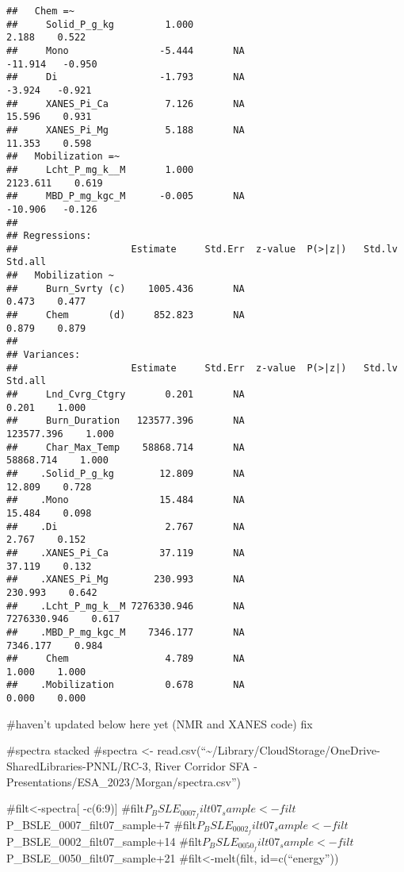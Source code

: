 \documentclass[
]{article}
\begin{document}
\begin{verbatim}
##   Chem =~                                                                     
##     Solid_P_g_kg         1.000                                  2.188    0.522
##     Mono                -5.444       NA                       -11.914   -0.950
##     Di                  -1.793       NA                        -3.924   -0.921
##     XANES_Pi_Ca          7.126       NA                        15.596    0.931
##     XANES_Pi_Mg          5.188       NA                        11.353    0.598
##   Mobilization =~                                                             
##     Lcht_P_mg_k__M       1.000                               2123.611    0.619
##     MBD_P_mg_kgc_M      -0.005       NA                       -10.906   -0.126
## 
## Regressions:
##                    Estimate     Std.Err  z-value  P(>|z|)   Std.lv     Std.all
##   Mobilization ~                                                              
##     Burn_Svrty (c)    1005.436       NA                         0.473    0.477
##     Chem       (d)     852.823       NA                         0.879    0.879
## 
## Variances:
##                    Estimate     Std.Err  z-value  P(>|z|)   Std.lv     Std.all
##     Lnd_Cvrg_Ctgry       0.201       NA                         0.201    1.000
##     Burn_Duration   123577.396       NA                    123577.396    1.000
##     Char_Max_Temp    58868.714       NA                     58868.714    1.000
##    .Solid_P_g_kg        12.809       NA                        12.809    0.728
##    .Mono                15.484       NA                        15.484    0.098
##    .Di                   2.767       NA                         2.767    0.152
##    .XANES_Pi_Ca         37.119       NA                        37.119    0.132
##    .XANES_Pi_Mg        230.993       NA                       230.993    0.642
##    .Lcht_P_mg_k__M 7276330.946       NA                   7276330.946    0.617
##    .MBD_P_mg_kgc_M    7346.177       NA                      7346.177    0.984
##     Chem                 4.789       NA                         1.000    1.000
##    .Mobilization         0.678       NA                         0.000    0.000
\end{verbatim}

\#haven't updated below here yet (NMR and XANES code) fix

\#spectra stacked \#spectra \textless-
read.csv(``\textasciitilde/Library/CloudStorage/OneDrive-SharedLibraries-PNNL/RC-3,
River Corridor SFA - Presentations/ESA\_2023/Morgan/spectra.csv'')

\#filt\textless-spectra{[} -c(6:9){]}
\#filt\(P_BSLE_0007_filt07_sample<-filt\)P\_BSLE\_0007\_filt07\_sample+7
\#filt\(P_BSLE_0002_filt07_sample<-filt\)P\_BSLE\_0002\_filt07\_sample+14
\#filt\(P_BSLE_0050_filt07_sample<-filt\)P\_BSLE\_0050\_filt07\_sample+21
\#filt\textless-melt(filt, id=c(``energy''))
\end{document}
